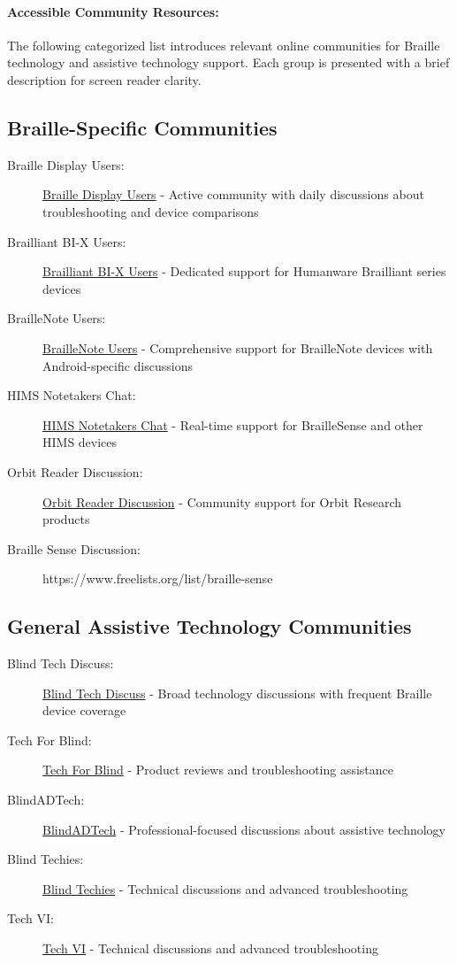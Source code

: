 \paragraph{Accessible Community Resources:}
The following categorized list introduces relevant online communities for Braille technology and assistive technology support. Each group is presented with a brief description for screen reader clarity.

\subsection{Braille-Specific Communities}
\label{braille-communities}
\begin{description}
    \item[Braille Display Users:] \href{https://groups.io/g/braille-display-users}{Braille Display Users} - Active community with daily discussions about troubleshooting and device comparisons
    \item[Brailliant BI-X Users:] \href{https://groups.io/g/Brailliant-BI-X-USERS/}{Brailliant BI-X Users} - Dedicated support for Humanware Brailliant series devices
    \item[BrailleNote Users:] \href{https://groups.io/g/braillenote}{BrailleNote Users} - Comprehensive support for BrailleNote devices with Android-specific discussions
    \item[HIMS Notetakers Chat:] \href{https://groups.io/g/hims-notetakers-chat}{HIMS Notetakers Chat} - Real-time support for BrailleSense and other HIMS devices
    \item[Orbit Reader Discussion:] \href{https://groups.io/g/orbit-reader}{Orbit Reader Discussion} - Community support for Orbit Research products
 \item[Braille Sense Discussion:]https://www.freelists.org/list/braille-sense
\end{description}

\subsection{General Assistive Technology Communities}
\label{at-communities}
\begin{description}
    \item[Blind Tech Discuss:] \href{https://groups.io/g/blindtechdiscuss}{Blind Tech Discuss} - Broad technology discussions with frequent Braille device coverage
    \item[Tech For Blind:] \href{https://groups.io/g/tech-for-blind}{Tech For Blind} - Product reviews and troubleshooting assistance
    \item[BlindADTech:] \href{https://groups.io/g/blindadtech}{BlindADTech} - Professional-focused discussions about assistive technology
    \item[Blind Techies:] \href{https://groups.io/g/blind-techies}{Blind Techies} - Technical discussions and advanced troubleshooting
    \item[Tech VI:] \href{https://groups.io/g/tech-vi}{Tech VI} - Technical discussions and advanced troubleshooting
\end{description}

